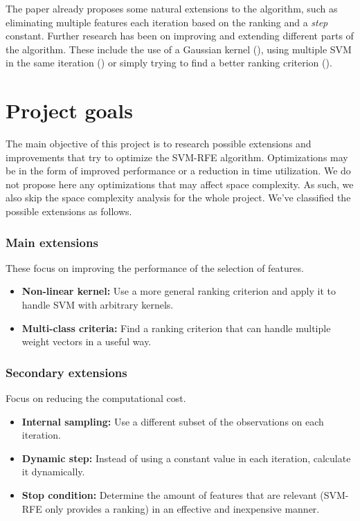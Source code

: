The paper already proposes some natural extensions to the al\-go\-rithm, such as eliminating multiple features each iteration based on the ranking and a \emph{step} constant. Further research has been on improving and extending different parts of the al\-go\-rithm. These include the use of a Gaussian kernel (\cite{xue_nonlinear_2018}), using multiple SVM in the same iteration (\cite{wang_classification_2011}) or simply trying to find a better ranking criterion (\cite{mundra_svm-rfe_2007}).


\section{Project goals}
\label{sec:ch1.objective}

The main objective of this project is to research possible extensions and im\-prove\-ments that try to optimize the SVM-RFE algorithm. Optimizations may be in the form of improved performance or a reduction in time utilization. We do not propose here any optimizations that may affect space complexity. As such, we also skip the space complexity analysis for the whole project. We've classified the possible extensions as follows.

\subsubsection*{Main extensions}

These focus on improving the performance of the selection of features.

\begin{itemize}
    \item \textbf{Non-linear kernel:} Use a more general ranking criterion and apply it to handle SVM with arbitrary kernels.
    \item \textbf{Multi-class criteria:} Find a ranking criterion that can handle multiple weight vectors in a useful way.
\end{itemize}

\subsubsection*{Secondary extensions}

Focus on reducing the computational cost.

\begin{itemize}
    \item \textbf{Internal sampling:} Use a different subset of the observations on each iteration.
    \item \textbf{Dynamic step:} Instead of using a constant value in each iteration, calculate it dynamically.
    \item \textbf{Stop condition:} Determine the amount of features that are relevant (SVM-RFE only provides a ranking) in an effective and inexpensive manner.
\end{itemize}

